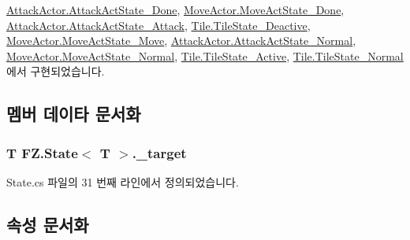 \hyperlink{class_attack_actor_1_1_attack_act_state___done_a87dc9fe06b7132e7eff68fce885c2cd2}{Attack\+Actor.\+Attack\+Act\+State\+\_\+\+Done}, \hyperlink{class_move_actor_1_1_move_act_state___done_a50f24c5382008b0205b7d5280880600f}{Move\+Actor.\+Move\+Act\+State\+\_\+\+Done}, \hyperlink{class_attack_actor_1_1_attack_act_state___attack_a2755f4dae2cf1f80a94b6bcc973d1bfd}{Attack\+Actor.\+Attack\+Act\+State\+\_\+\+Attack}, \hyperlink{class_tile_1_1_tile_state___deactive_a806c5dbc5eb43903ad41d448f3d25c61}{Tile.\+Tile\+State\+\_\+\+Deactive}, \hyperlink{class_move_actor_1_1_move_act_state___move_a8eb57e77a4d5d6e1e0b2f6ccf8532d73}{Move\+Actor.\+Move\+Act\+State\+\_\+\+Move}, \hyperlink{class_attack_actor_1_1_attack_act_state___normal_a7d6644fed269325b8f62138d8adb50f5}{Attack\+Actor.\+Attack\+Act\+State\+\_\+\+Normal}, \hyperlink{class_move_actor_1_1_move_act_state___normal_ac679d09107c9471774c30ffc169b5ad0}{Move\+Actor.\+Move\+Act\+State\+\_\+\+Normal}, \hyperlink{class_tile_1_1_tile_state___active_ab53c7c818d65122d6d36c9681ca53bf9}{Tile.\+Tile\+State\+\_\+\+Active}, \hyperlink{class_tile_1_1_tile_state___normal_acf613382b6ddeff2fcc226d8caeb0b53}{Tile.\+Tile\+State\+\_\+\+Normal}에서 구현되었습니다.



\subsection{멤버 데이타 문서화}
\subsubsection[{\texorpdfstring{\+\_\+target}{_target}}]{\setlength{\rightskip}{0pt plus 5cm}T {\bf F\+Z.\+State}$<$ T $>$.\+\_\+target\hspace{0.3cm}{\ttfamily [private]}}\hypertarget{class_f_z_1_1_state_aff2ae4a7940bd3e363e98e3c0d76d011}{}\label{class_f_z_1_1_state_aff2ae4a7940bd3e363e98e3c0d76d011}


State.\+cs 파일의 31 번째 라인에서 정의되었습니다.



\subsection{속성 문서화}
